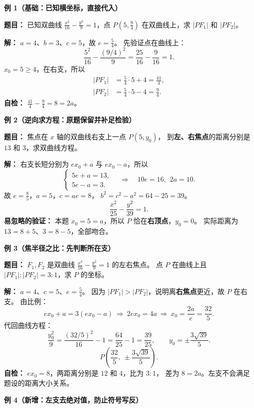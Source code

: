 \begin{examplebox}

\textbf{\textcolor{CExample}{例 1（基础：已知横坐标，直接代入）}}

\textbf{题目：}
已知双曲线 $\frac{x^2}{16}-\frac{y^2}{9}=1$，点
$P\left(5,\frac94\right)$ 在双曲线上，求 $|PF_1|$ 和 $|PF_2|$。

\textbf{解：} $a=4$、$b=3$、$c=5$，故 $e=\frac54$。
先验证点在曲线上：
\[
 \frac{5^2}{16}-\frac{(9/4)^2}{9}
 =\frac{25}{16}-\frac9{16}=1.
\]
$x_0=5\ge4$，在右支，所以
\[
 \begin{aligned}
 |PF_1|&=\frac54\cdot5+4=\boxed{\frac{41}{4}},\\
 |PF_2|&=\frac54\cdot5-4=\boxed{\frac94}.
 \end{aligned}
\]
\textbf{自检：} $\frac{41}{4}-\frac94=8=2a$。

\medskip
\textbf{\textcolor{CExample}{例 2（逆向求方程：原题保留并补足检验）}}

\textbf{题目：}
焦点在 $x$ 轴的双曲线右支上一点 $P(5,y_0)$，
到\textbf{左、右焦点}的距离分别是 $13$ 和 $3$，求双曲线方程。

\textbf{解：} 右支长短分别为 $ex_0+a$ 与 $ex_0-a$，所以
\[
 \begin{cases}5e+a=13,\\5e-a=3.\end{cases}
 \quad\Longrightarrow\quad
 10e=16,\ \ 2a=10.
\]
故 $e=\frac85$，$a=5$，$c=ae=8$，
$b^2=c^2-a^2=64-25=39$。
\[
 \boxed{\frac{x^2}{25}-\frac{y^2}{39}=1}.
\]
\textbf{易忽略的验证：}
本题 $x_0=5=a$，所以 $P$ 恰在\textbf{右顶点}，$y_0=0$。
实际距离为 $13=8+5$、$3=8-5$，全部吻合。

\medskip
\textbf{\textcolor{CExample}{例 3（焦半径之比：先判断所在支）}}

\textbf{题目：}
$F_1,F_2$ 是双曲线 $\frac{x^2}{16}-\frac{y^2}{9}=1$ 的左右焦点。
点 $P$ 在曲线上且 $|PF_1|:|PF_2|=3:1$，求 $P$ 的坐标。

\textbf{解：} $a=4$、$c=5$、$e=\frac54$。
因为 $|PF_1|>|PF_2|$，说明离\textbf{右焦点}更近，故 $P$ 在右支。
由比例：
\[
 ex_0+a=3(ex_0-a)
 \ \Longrightarrow\ 2ex_0=4a
 \ \Longrightarrow\ x_0=\frac{2a}{e}=\frac{32}{5}.
\]
代回曲线方程：
\[
 \frac{y_0^2}{9}
 =\frac{(32/5)^2}{16}-1
 =\frac{64}{25}-1=\frac{39}{25},
 \qquad y_0=\pm\frac{3\sqrt{39}}5.
\]
\[
 \boxed{P\left(\frac{32}{5},\ \pm\frac{3\sqrt{39}}5\right)}.
\]
\textbf{自检：} $ex_0=8$，两距离分别是 $12$ 和 $4$，比为 $3:1$，
差为 $8=2a$。左支不会满足题设的距离大小关系。

\medskip
\textbf{\textcolor{CExample}{例 4（新增：左支去绝对值，防止符号写反）}}


\end{examplebox}

